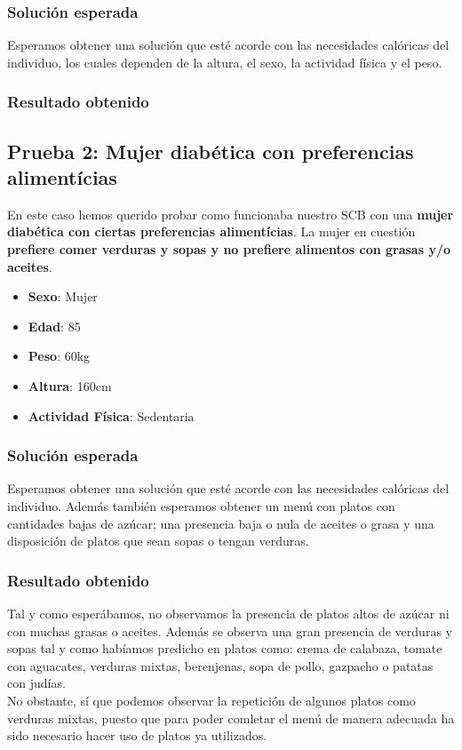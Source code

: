 \documentclass[12]{article}
\begin{document}
\subsubsection{Solución esperada}
Esperamos obtener una solución que esté acorde con las necesidades calóricas del individuo, los cuales dependen de la altura, el sexo, la actividad física y el peso.

\subsubsection{Resultado obtenido}

\subsection{Prueba 2: Mujer diabética con preferencias alimentícias}
En este caso hemos querido probar como funcionaba nuestro SCB con una \textbf{mujer diabética con ciertas preferencias alimentícias}. La mujer en cuestión \textbf{prefiere comer verduras y sopas y no prefiere alimentos con grasas y/o aceites}.  

\begin{itemize}
\item \textbf{Sexo}: Mujer
\item \textbf{Edad}: 85
\item \textbf{Peso}: 60kg
\item \textbf{Altura}: 160cm
\item \textbf{Actividad Física}: Sedentaria
\end{itemize}

\subsubsection{Solución esperada}
Esperamos obtener una solución que esté acorde con las necesidades calóricas del individuo. Además también esperamos obtener un menú con platos con cantidades bajas de azúcar; una presencia baja o nula de aceites o grasa y una disposición de platos que sean sopas o tengan verduras.

\subsubsection{Resultado obtenido}
Tal y como esperábamos, no observamos la presencia de platos altos de azúcar ni con muchas grasas o aceites. Además se observa una gran presencia de verduras y sopas tal y como habíamos predicho en platos como: crema de calabaza, tomate con aguacates, verduras mixtas, berenjenas, sopa de pollo, gazpacho o patatas con judías. 
\\
No obstante, sí que podemos observar la repetición de algunos platos como verduras mixtas, puesto que para poder comletar el menú de manera adecuada ha sido necesario hacer uso de platos ya utilizados. 
\end{document}

